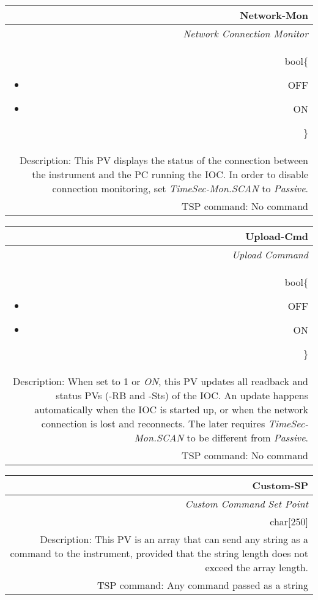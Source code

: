 \documentclass[openany]{article}
\begin{document}
		\begin{tabular}{N}
			\hline
			\bfseries Network-Mon\label{pv:network-mon} \\ \hline
			\emph{Network Connection Monitor} \\
			bool\{\begin{itemize}[noitemsep]
				\small
				\item[] OFF
				\item[] ON
			\end{itemize}\} \\
			Description: This PV displays the status of the connection between the instrument and the PC running the IOC. In order to disable connection monitoring, set \emph{TimeSec-Mon.SCAN} to \emph{Passive}. \\
			TSP command: No command
		\end{tabular}

		\begin{tabular}{N}
			\hline
			\bfseries Upload-Cmd\label{pv:upload-cmd} \\ \hline
			\emph{Upload Command} \\
			bool\{\begin{itemize}[noitemsep]
				\small
				\item[] OFF
				\item[] ON
			\end{itemize}\} \\
			Description: When set to 1 or \emph{ON}, this PV updates all readback and status PVs (-RB and -Sts) of the IOC. An update happens automatically when the IOC is started up, or when the network connection is lost and reconnects. The later requires \emph{TimeSec-Mon.SCAN} to be different from \emph{Passive}. \\
			TSP command: No command
		\end{tabular}

		\begin{tabular}{N}
			\hline
			\bfseries Custom-SP\label{pv:custom-sp} \\ \hline
			\emph{Custom Command Set Point} \\
			char[250] \\
			Description: This PV is an array that can send any string as a command to the instrument, provided that the string length does not exceed the array length. \\
			TSP command: Any command passed as a string
		\end{tabular}
\end{document}

